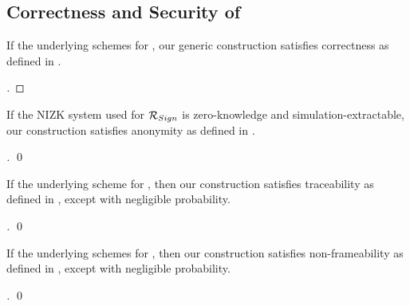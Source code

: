 \subsection{Correctness and Security of \GSACGen}
\label{ssec:security-gsac}

\begin{theorem}
  \label{thm:correctness-gsac}
  If the underlying schemes for , our generic construction \GSACGen
  satisfies correctness as defined in .
\end{theorem}

\begin{proof}[]
\end{proof}

\begin{theorem}
  \label{thm:anonymity-gsac}
  If the NIZK system used for $\mathcal{R}_{Sign}$ is zero-knowledge and
  simulation-extractable, our \GSACGen construction satisfies anonymity as
  defined in .
\end{theorem}

\begin{proof}[]
  \qed
\end{proof}

\begin{theorem}
  \label{thm:trace-gsac}
  If the underlying scheme for , then our \GSACGen construction
  satisfies traceability as defined in , except
  with negligible probability.
\end{theorem}


\begin{proof}[]
  \qed
\end{proof}

\begin{theorem}
  \label{thm:frame-gsac}
  If the underlying schemes for , then our \GSACGen construction
  satisfies non-frameability as defined in , except with
  negligible probability.
\end{theorem}

\begin{proof}[]
  \qed
\end{proof}

